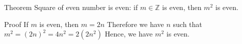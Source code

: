 Theorem 
Square of even number is even: if $m \in \mathbb{Z}$ is even, then $m^2$ is even.


Proof
If $m$ is even, then $m = 2n$
Therefore we have $n$ such that $m^2 = (2n)^2 = 4n^2 = 2 (2n^2)$
Hence, we have $m^2$ is even.